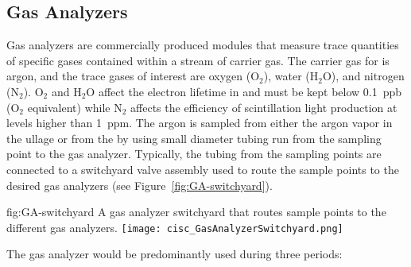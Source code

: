 \subsection{Gas Analyzers}
\label{sec:fdgen-slow-cryo-gas-anlyz}
 Gas analyzers are commercially produced modules that measure trace quantities of specific gases contained within a stream of carrier gas. The carrier gas for  is argon, and the trace gases of interest are oxygen ($\text{O}_2$), water ($\text{H}_2\text{O}$), and nitrogen ($\text{N}_2$). $\text{O}_2$ and $\text{H}_2\text{O}$ affect the electron lifetime in  and must be kept below \SI{0.1}{ppb} ($\text{O}_2$ equivalent) while $\text{N}_2$ affects the efficiency of scintillation light production at levels higher than \SI{1}{ppm}.
The argon is sampled from either the argon vapor in the ullage or from the  by using small diameter tubing run from the sampling point to the gas analyzer. Typically, the tubing from the sampling points are connected to a switchyard valve assembly used to route the sample points to the desired gas analyzers (see Figure~\ref{fig:GA-switchyard}).


\begin{dunefigure}{fig:GA-switchyard}
  {A gas analyzer switchyard that routes sample points to the different gas analyzers.}
  \texttt{[image: cisc\_GasAnalyzerSwitchyard.png]}
\end{dunefigure}

The gas analyzer would be predominantly used during three periods: 


